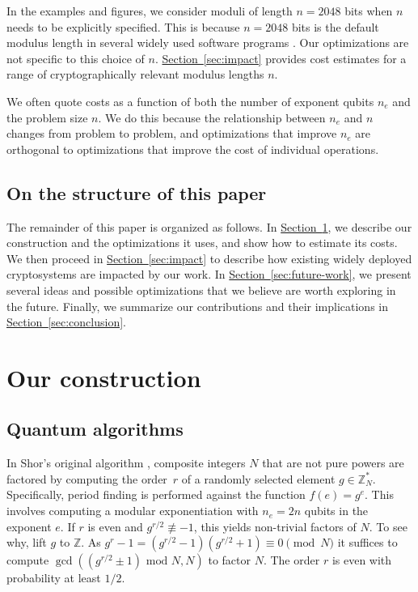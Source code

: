 \documentclass[superscriptaddress,notitlepage,longbibliography]{revtex4-1}
\theoremstyle{definition}
\theoremstyle{definition}
\renewcommand{\sec}[1]{\hyperref[sec:#1]{Section~\ref*{sec:#1}}}
\newcommand{\lenexp}{{n_e}}
\newcommand{\gen}{g}
\begin{document}
In the examples and figures, we consider moduli of length $n = 2048$ bits when $n$ needs to be explicitly specified.
This is because $n = 2048$ bits is the default modulus length in several widely used software programs \cite{ssh-keygen-man-page2018, gpg-faq-key-size2018, open-ssl-source2018}.
Our optimizations are not specific to this choice of $n$.
\sec{impact} provides cost estimates for a range of cryptographically relevant modulus lengths $n$.

We often quote costs as a function of both the number of exponent qubits $\lenexp$ and the problem size $n$.
We do this because the relationship between $\lenexp$ and $n$ changes from problem to problem, and optimizations that improve $\lenexp$ are orthogonal to optimizations that improve the cost of individual operations.



\subsection{On the structure of this paper}

The remainder of this paper is organized as follows.
In \sec{construction}, we describe our construction and the optimizations it uses, and show how to estimate its costs.
We then proceed in
\sec{impact} to describe how existing widely deployed cryptosystems are impacted by our work.
In \sec{future-work}, we present several ideas and possible optimizations that we believe are worth exploring in the future.
Finally, we summarize our contributions and their implications in \sec{conclusion}.








\section{Our construction}
\label{sec:construction}

\subsection{Quantum algorithms}

In Shor's original algorithm \cite{shor1994}, composite integers $N$ that are not pure powers are factored by computing the order~$r$ of a randomly selected element $\gen \in \mathbb Z_N^*$.
Specifically, period finding is performed against the function $f(e) = \gen^e$.
This involves computing a modular exponentiation with $\lenexp=2n$ qubits in the exponent $e$.
If $r$ is even and $\gen^{r/2} \not\equiv -1$, this yields non-trivial factors of $N$.
To see why, lift $\gen$ to $\mathbb Z$.
As $\gen^r - 1 = (\gen^{r/2} - 1)(\gen^{r/2} + 1)
\equiv 0 \pmod{N}$ it suffices to compute $\gcd((\gen^{r/2} \pm 1) \text{ mod } N, N)$ to factor $N$.
The order $r$ is even with probability at least $1/2$.
\end{document}
